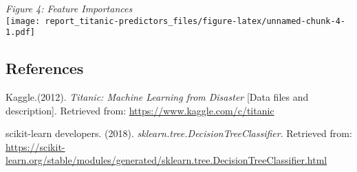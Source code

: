 \documentclass[]{article}
\begin{document}
\emph{Figure 4: Feature Importances}\\
\texttt{[image: report\_titanic-predictors\_files/figure-latex/unnamed-chunk-4-1.pdf]}

\subsection{References}\label{references}

Kaggle.(2012). \emph{Titanic: Machine Learning from Disaster} {[}Data
files and description{]}. Retrieved from:
\url{https://www.kaggle.com/c/titanic}

scikit-learn developers. (2018).
\emph{sklearn.tree.DecisionTreeClassifier}. Retrieved from:\\
\url{https://scikit-learn.org/stable/modules/generated/sklearn.tree.DecisionTreeClassifier.html}
\end{document}
